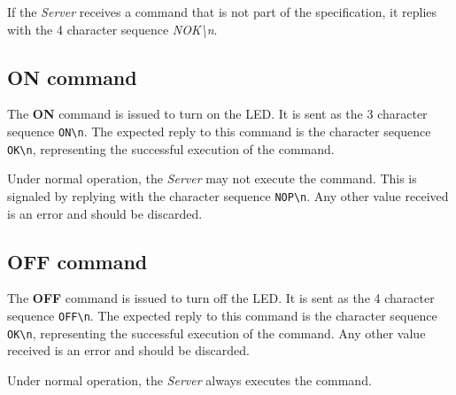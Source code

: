 \documentclass[conference, a4paper]{IEEEtran}
\begin{document}
If the \textit{Server} receives a command that is not part of the specification, it replies with the 4 character sequence \textit{NOK\textbackslash n}.

\subsection{ON command}

The \textbf{ON} command is issued to turn on the LED. It is sent as the 3 character sequence \texttt{ON\textbackslash n}. The expected reply to this command is the character sequence \texttt{OK\textbackslash n}, representing the successful execution of the command.

Under normal operation, the \textit{Server} may not execute the command. This is signaled by replying with the character sequence \texttt{NOP\textbackslash n}. Any other value received is an error and should be discarded.

\subsection{OFF command}

The \textbf{OFF} command is issued to turn off the LED. It is sent as the 4 character sequence \texttt{OFF\textbackslash n}. The expected reply to this command is the character sequence \texttt{OK\textbackslash n}, representing the successful execution of the command. Any other value received is an error and should be discarded.

Under normal operation, the \textit{Server} always executes the command.

\end{document}
